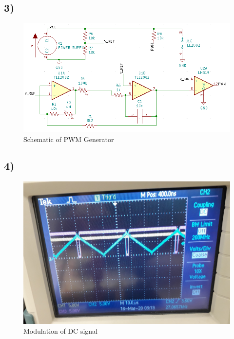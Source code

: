 \documentclass[]{IEEEtran}
\begin{document}
\begin{multicols}{2}
\subsection{3)}

\end{multicols}
\begin{figure}[H]
	\centering
	\includegraphics[width=1\linewidth]{screenshot003}
	\caption{Schematic of PWM Generator}
	\label{fig:screenshot003}
\end{figure}
\begin{multicols}{2}
	
\end{multicols}
	\subsection{4)}

\begin{figure}[H]
	\centering
	\caption{Modulation of DC signal}
	\label{fig:crossing}
	\includegraphics[width=1\linewidth]{crossing}
\end{figure}
	
\end{document}
